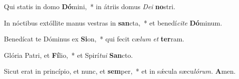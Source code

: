 \item Qui statis in domo \textbf{Dó}mini,~* in átriis domus \textit{Dei} \textbf{no}stri.
\item In nóctibus extóllite manus vestras in \textbf{san}cta,~* et benedí\textit{cite} \textbf{Dó}minum.
\item Benedícat te Dóminus ex \textbf{Si}on,~* qui fecit cæ\textit{lum} \textit{et} \textbf{ter}ram.
\item Glória Patri, et \textbf{Fí}lio,~* et Spirí\hspace{0.03em}\textit{tui} \textbf{San}cto.
\item Sicut erat in princípio, et nunc, et \textbf{sem}per,~* et in sǽcula sæcu\hspace{0.03em}\textit{lórum.} \textbf{A}men.
